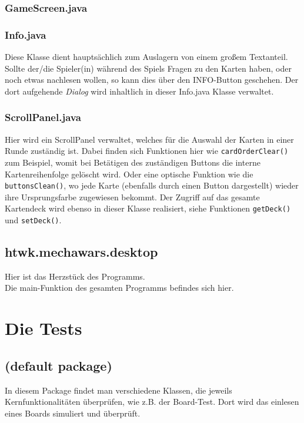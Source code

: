\documentclass[12pt,a4paper,oneside]{book}
\theoremstyle{plain}
\numberwithin{equation}{chapter} \DeclareMathOperator{\Var}{Var}
\begin{document}
\subsection{GameScreen.java}
    

\subsection{Info.java}
    Diese Klasse dient hauptsächlich zum Auslagern von einem großem Textanteil. Sollte der/die Spieler(in) während des Spiels Fragen zu den Karten haben, oder noch etwas nachlesen wollen, so kann dies über den INFO-Button geschehen. Der dort aufgehende \textit{Dialog} wird inhaltlich in dieser Info.java Klasse verwaltet.

\subsection{ScrollPanel.java}
    Hier wird ein ScrollPanel verwaltet, welches für die Auswahl der Karten in einer Runde zuständig ist. Dabei finden sich Funktionen hier wie \texttt{cardOrderClear()} zum Beispiel, womit bei Betätigen des zuständigen Buttons die interne Kartenreihenfolge gelöscht wird. Oder eine optische Funktion wie die \texttt{buttonsClean()}, wo jede Karte (ebenfalls durch einen Button dargestellt) wieder ihre Ursprungsfarbe zugewiesen bekommt. Der Zugriff auf das gesamte Kartendeck wird ebenso in dieser Klasse realisiert, siehe Funktionen \texttt{getDeck()} und \texttt{setDeck()}.

\newpage
\section{htwk.mechawars.desktop}
    Hier ist das Herzstück des Programms.\\
    Die main-Funktion des gesamten Programms befindes sich hier.

\chapter{Die Tests}
\section{(default package)}
    In diesem Package findet man verschiedene Klassen, die jeweils Kernfunktionalitäten überprüfen, wie z.B. der Board-Test. Dort wird das einlesen eines Boards simuliert und überprüft.
\end{document}

